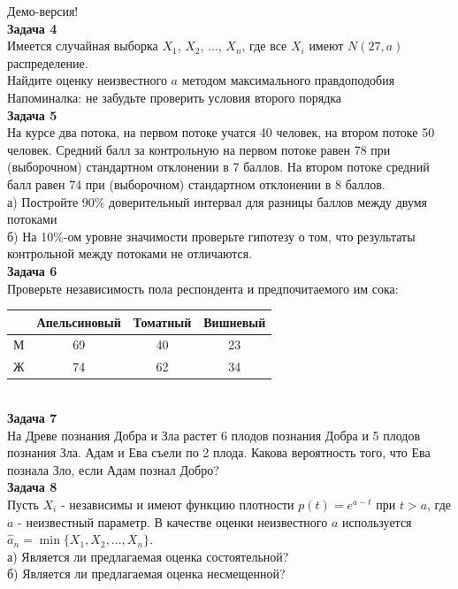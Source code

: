 \documentclass[12pt, a4paper]{article}\usepackage[]{graphicx}\usepackage[]{color}
\begin{document}
	Демо-версия! \\

	\textbf{Задача 4} \\ %
	Имеется случайная выборка $X_{1}$, $X_{2}$, ..., $X_{n}$, где все $X_{i}$ имеют $N(27,a)$ распределение. \\
	Найдите оценку неизвестного $a$ методом максимального правдоподобия \\
	Напоминалка: не забудьте проверить условия второго порядка \\

	\textbf{Задача 5} \\ %
	На курсе два потока, на первом потоке учатся 40 человек, на втором
	потоке 50 человек. Средний балл за контрольную на первом потоке
	равен 78 при (выборочном) стандартном отклонении в 7 баллов. На
	втором потоке средний балл равен 74 при (выборочном) стандартном
	отклонении в 8 баллов. \\
	а) Постройте 90\% доверительный интервал для разницы баллов между
	двумя потоками \\
	б) На 10\%-ом уровне значимости проверьте гипотезу о том, что
	результаты контрольной между потоками не отличаются. \\


	\textbf{Задача 6} \\ %
	Проверьте независимость пола респондента и предпочитаемого
	им сока: \\
	\begin{tabular}{|c|c|c|c|}
		\hline
		& Апельсиновый & Томатный & Вишневый \\
		\hline
		М & 69 & 40 & 23 \\
		Ж & 74 & 62 & 34 \\
		\hline
	\end{tabular} \\

	\textbf{Задача 7} \\ %
	На Древе познания Добра и Зла растет 6 плодов познания Добра и 5 плодов познания Зла. Адам и Ева съели по 2 плода. Какова вероятность того, что Ева познала Зло, если Адам познал Добро? \\

	\textbf{Задача 8} \\ %
	Пусть $X_{i}$ - независимы и имеют функцию плотности $p(t)=e^{a-t}$ при $t>a$, где $a$ - неизвестный параметр. В качестве оценки неизвестного $a$ используется $\hat{a}_{n}=\min\{X_{1},X_{2},...,X_{n}\}$. \\
	а) Является ли предлагаемая оценка состоятельной? \\
	б) Является ли предлагаемая оценка несмещенной? \\
\end{document}
